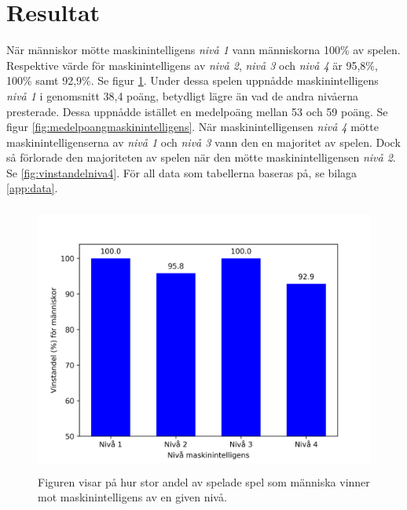 \documentclass[12pt,a4paper]{article}
\begin{document}
  \section{Resultat}\label{sec:resultat}
    När människor mötte maskinintelligens \emph{nivå 1} vann människorna 100\% av spelen. Respektive värde för maskinintelligens av \emph{nivå 2}, \emph{nivå 3} och \emph{nivå 4} är 95,8\%, 100\% samt 92,9\%. Se figur \ref{fig:vinstandelmanniskor}. Under dessa spelen uppnådde maskinintelligens \emph{nivå 1} i genomsnitt 38,4 poäng, betydligt lägre än vad de andra nivåerna presterade. Dessa uppnådde istället en medelpoäng mellan 53 och 59 poäng. Se figur \ref{fig:medelpoangmaskinintelligens}. När maskinintelligensen \emph{nivå 4} mötte maskinintelligenserna av \emph{nivå 1} och \emph{nivå 3} vann den en majoritet av spelen. Dock så förlorade den majoriteten av spelen när den mötte maskinintelligensen \emph{nivå 2}. Se \ref{fig:vinstandelniva4}. För all data som tabellerna baseras på, se bilaga \ref{app:data}.
    

    \begin{figure}[H]
      \centering
      \includegraphics[height=3.5in]{./images/vinstandel_manniskor.png}
      \caption{Figuren visar på hur stor andel av spelade spel som människa vinner mot maskinintelligens av en given nivå.}\label{fig:vinstandelmanniskor}
    \end{figure}
    
\end{document}
